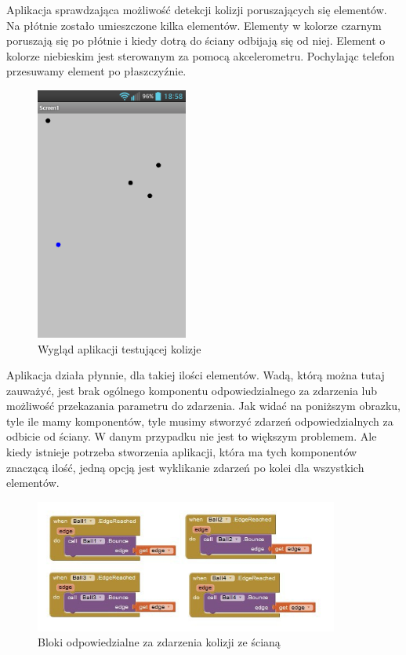 Aplikacja sprawdzająca możliwość detekcji kolizji poruszających się elementów. Na płótnie zostało umieszczone kilka elementów. Elementy w kolorze czarnym poruszają się po płótnie i kiedy dotrą do ściany odbijają się od niej. Element o kolorze niebieskim jest sterowanym za pomocą akcelerometru. Pochylając telefon przesuwamy element po płaszczyźnie.

\begin{figure}[H]
\centering\includegraphics[width=5cm]{figures/apps/ai_collision}
\caption{Wygląd aplikacji testującej kolizje}
\end{figure}

Aplikacja działa płynnie, dla takiej ilości elementów. Wadą, którą można tutaj zauważyć, jest brak ogólnego komponentu odpowiedzialnego za zdarzenia lub możliwość przekazania parametru do zdarzenia. Jak widać na poniższym obrazku, tyle ile mamy komponentów, tyle musimy stworzyć zdarzeń odpowiedzialnych za odbicie od ściany. W danym przypadku nie jest to większym problemem. Ale kiedy istnieje potrzeba stworzenia aplikacji, która ma tych komponentów znaczącą ilość, jedną opcją jest wyklikanie zdarzeń po kolei dla wszystkich elementów.


\begin{figure}[H]
\centering\includegraphics[width=10cm]{figures/apps/ai_collision_blocks}
\caption{Bloki odpowiedzialne za zdarzenia kolizji ze ścianą}
\end{figure}

